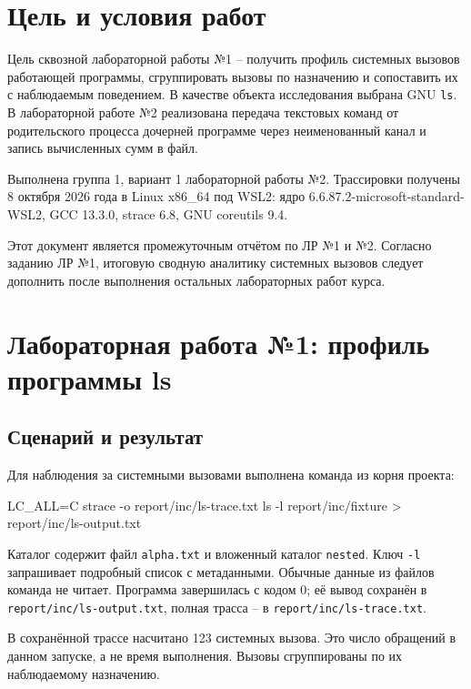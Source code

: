 \documentclass[12pt,a4paper]{article}
\begin{document}


\section{Цель и условия работ}

Цель сквозной лабораторной работы №1 -- получить профиль системных вызовов работающей программы, сгруппировать вызовы по назначению и сопоставить их с наблюдаемым поведением. В качестве объекта исследования выбрана GNU \texttt{ls}. В лабораторной работе №2 реализована передача текстовых команд от родительского процесса дочерней программе через неименованный канал и запись вычисленных сумм в файл.

Выполнена группа 1, вариант 1 лабораторной работы №2. Трассировки получены 8 октября 2026 года в Linux x86\_64 под WSL2: ядро 6.6.87.2-microsoft-standard-WSL2, GCC 13.3.0, strace 6.8, GNU coreutils 9.4.

Этот документ является промежуточным отчётом по ЛР №1 и №2. Согласно заданию ЛР №1, итоговую сводную аналитику системных вызовов следует дополнить после выполнения остальных лабораторных работ курса.

\section{Лабораторная работа №1: профиль программы ls}

\subsection{Сценарий и результат}

Для наблюдения за системными вызовами выполнена команда из корня проекта:

\begin{terminal}
LC_ALL=C strace -o report/inc/ls-trace.txt ls -l report/inc/fixture > report/inc/ls-output.txt
\end{terminal}

Каталог содержит файл \texttt{alpha.txt} и вложенный каталог \texttt{nested}. Ключ \texttt{-l} запрашивает подробный список с метаданными. Обычные данные из файлов команда не читает. Программа завершилась с кодом 0; её вывод сохранён в \texttt{report/inc/ls-output.txt}, полная трасса -- в \texttt{report/inc/ls-trace.txt}.

В сохранённой трассе насчитано 123 системных вызова. Это число обращений в данном запуске, а не время выполнения. Вызовы сгруппированы по их наблюдаемому назначению.
\end{document}
